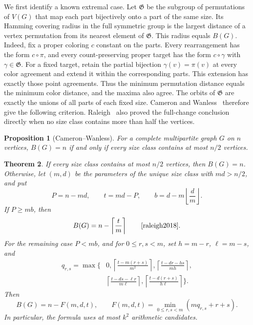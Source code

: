 \documentclass[11pt,reqno]{amsart}
\numberwithin{equation}{section}
\newtheorem{theorem}{Theorem}[section]
\newtheorem{proposition}[theorem]{Proposition}
\theoremstyle{definition}
\theoremstyle{remark}
\begin{document}
We first identify a known extremal case. Let $\mathfrak G$ be the subgroup
of permutations of $V(G)$ that map each part bijectively onto a part of
the same size. Its Hamming covering radius in the full symmetric group
is the largest distance of a vertex permutation from its nearest element
of $\mathfrak G$. This radius equals $B(G)$.
Indeed, fix a proper coloring $c$ constant on the parts.
Every rearrangement has the form $c\circ\pi$, and every count-preserving
proper target has the form $c\circ\gamma$ with $\gamma\in\mathfrak G$.
For a fixed target, retain the partial bijection $\gamma(v)=\pi(v)$
at every color agreement and extend it within the corresponding parts.
This extension has exactly those point agreements. Thus the minimum
permutation distance equals the minimum color distance, and the maxima
also agree. The orbits of $\mathfrak G$ are exactly the unions of all
parts of each fixed size.
Cameron and Wanless~\cite[Theorem~14]{cameronwanless2005} therefore give
the following criterion. Raleigh~\cite[Theorem~1]{raleigh2018} also
proved the full-change conclusion directly when no size class contains
more than half the vertices.

\begin{proposition}[Cameron--Wanless]\label{cor:mp:full-change}
For a complete multipartite graph $G$ on $n$ vertices, $B(G)=n$ if and
only if every size class contains at most $n/2$ vertices.
\end{proposition}

\begin{theorem}\label{thm:mp:ordinary}
If every size class contains at most $n/2$ vertices, then $B(G)=n$.
Otherwise, let $(m,d)$ be the parameters of the unique size class with
$md>n/2$, and put
\[
 P=n-md,\qquad t=md-P,\qquad
 b=d-m\left\lfloor\frac d m\right\rfloor.
\]
If $P\ge mb$, then
\begin{equation}\label{eq:mp:raleigh-regime}
 B(G)=n-\left\lceil\frac t m\right\rceil
 \qquad\text{\cite[Theorem~4]{raleigh2018}}.
\end{equation}
For the remaining case $P<mb$, and for $0\le r,s<m$, set $h=m-r$,
$\ell=m-s$, and
\begin{equation}\label{eq:mp:ordinary-q}
\begin{split}
 q_{r,s}=\max\bigg\{&0,
 \left\lceil\frac{t-m(r+s)}{m^2}\right\rceil,
 \left\lceil\frac{t-dr-hs}{mh}\right\rceil,\\
 &\left\lceil\frac{t-ds-\ell r}{m\ell}\right\rceil,
 \left\lceil\frac{t-d(r+s)}{h\ell}\right\rceil\bigg\}.
\end{split}
\end{equation}
Then
\begin{equation}\label{eq:mp:ordinary}
 B(G)=n-F(m,d,t),\qquad
 F(m,d,t)=\min_{0\le r,s<m}(mq_{r,s}+r+s).
\end{equation}
In particular, the formula uses at most $k^2$ arithmetic candidates.
\end{theorem}
\end{document}
